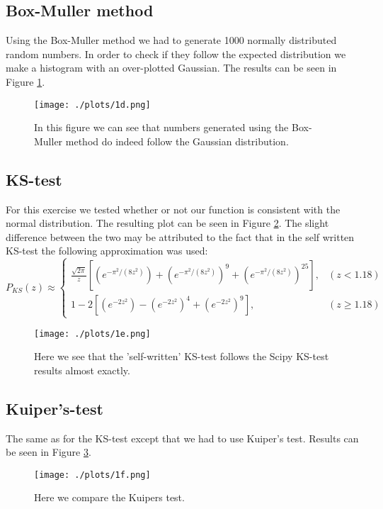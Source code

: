 \documentclass[a4paper,10pt]{article}
\begin{document}
\subsection{Box-Muller method}
Using the Box-Muller method we had to generate 1000 normally distributed random numbers. In order to check if they follow the expected distribution we make a histogram with an over-plotted Gaussian. The results can be seen in Figure \ref{fig:1d}.

\begin{figure}[h!]
  \centering
  \texttt{[image: ./plots/1d.png]}
  \caption{In this figure we can see that numbers generated using the Box-Muller method do indeed follow the Gaussian distribution.}
  \label{fig:1d}
\end{figure}

\subsection{KS-test}
For this exercise we tested whether or not our function is consistent with the normal distribution. The resulting plot can be seen in Figure \ref{fig:1e}. The slight difference between the two may be attributed to the fact that in the self written KS-test the following approximation was used: 
\[
	P_{KS}(z)\approx
\begin{cases}
	\frac{\sqrt{2\pi}}{z}[(e^{-\pi^2/(8z^2)})+(e^{-\pi^2/(8z^2)})^9+(e^{-\pi^2/(8z^2)})^25],& (z<1.18)\\
	1-2[(e^{-2z^2})-(e^{-2z^2})^4+(e^{-2z^2})^9],	& (z\geq 1.18)
\end{cases}
\]


\begin{figure}[h!]
  \centering
  \texttt{[image: ./plots/1e.png]}
  \caption{Here we see that the 'self-written' KS-test follows the Scipy KS-test results almost exactly.}
  \label{fig:1e}
\end{figure}

\subsection{Kuiper's-test}

The same as for the KS-test except that we had to use Kuiper's test. Results can be seen in Figure \ref{fig:1f}.

\begin{figure}[h!]
  \centering
  \texttt{[image: ./plots/1f.png]}
  \caption{Here we compare the Kuipers test.}
  \label{fig:1f}
\end{figure}
\end{document}
